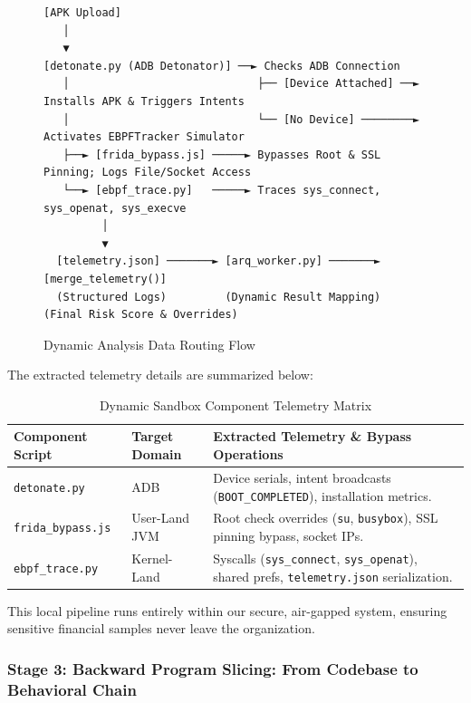 \documentclass[10pt,a4paper]{article}
\begin{document}
\begin{figure}[H]
  \centering
  \begin{mdframed}[backgroundcolor=black!2,linecolor=black!40,innerleftmargin=10pt,innerrightmargin=10pt,topline=true,bottomline=true]
  \small
  \begin{verbatim}
[APK Upload]
   │
   ▼
[detonate.py (ADB Detonator)] ──► Checks ADB Connection
   │                             ├── [Device Attached] ──► Installs APK & Triggers Intents
   │                             └── [No Device] ────────► Activates EBPFTracker Simulator
   ├──► [frida_bypass.js] ─────► Bypasses Root & SSL Pinning; Logs File/Socket Access
   └──► [ebpf_trace.py]   ─────► Traces sys_connect, sys_openat, sys_execve
         │
         ▼
  [telemetry.json] ───────► [arq_worker.py] ───────► [merge_telemetry()]
  (Structured Logs)         (Dynamic Result Mapping)  (Final Risk Score & Overrides)
  \end{verbatim}
  \end{mdframed}
  \caption{Dynamic Analysis Data Routing Flow}
  \label{fig:dynamic_flow}
\end{figure}

The extracted telemetry details are summarized below:

\begin{table}[H]
\centering
\small
\begin{tabular}{|l|l|l|}
\hline
\textbf{Component Script} & \textbf{Target Domain} & \textbf{Extracted Telemetry \& Bypass Operations} \\ \hline
\texttt{detonate.py} & ADB & Device serials, intent broadcasts (\texttt{BOOT\_COMPLETED}), installation metrics. \\ \hline
\texttt{frida\_bypass.js} & User-Land JVM & Root check overrides (\texttt{su}, \texttt{busybox}), SSL pinning bypass, socket IPs. \\ \hline
\texttt{ebpf\_trace.py} & Kernel-Land & Syscalls (\texttt{sys\_connect}, \texttt{sys\_openat}), shared prefs, \texttt{telemetry.json} serialization. \\ \hline
\end{tabular}
\caption{Dynamic Sandbox Component Telemetry Matrix}
\label{tab:dynamic_matrix}
\end{table}

This local pipeline runs entirely within our secure, air-gapped system, ensuring sensitive financial samples never leave the organization.

\subsubsection*{Stage 3: Backward Program Slicing: From Codebase to Behavioral Chain}
\end{document}
